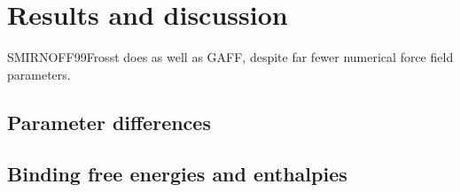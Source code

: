 \documentclass[9pt,lineno]{elife}
\begin{document}


\section{Results and discussion}
SMIRNOFF99Frosst does as well as GAFF, despite far fewer numerical force field parameters.

\subsection{Parameter differences}

\subsection{Binding free energies and enthalpies}
\end{document}
